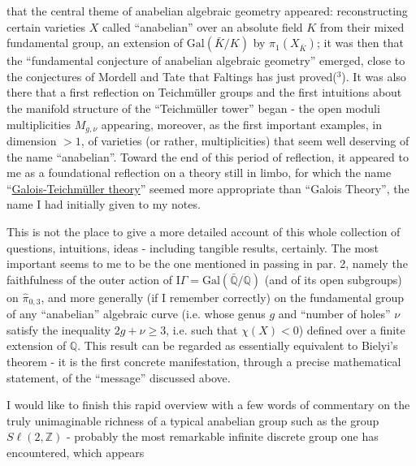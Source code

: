 
that the central theme of anabelian algebraic geometry appeared:
reconstructing certain varieties $X$ called ``anabelian''
over an absolute field $K$ from their mixed fundamental group,
an extension of $\mathrm{Gal}(\bar{K}/K)$ by $\pi_1(X_{\bar{K}})$; it was then that the
``fundamental conjecture of anabelian algebraic geometry'' emerged,
close to the conjectures of Mordell and Tate that Faltings
has just proved($^3$). It was also there that a first reflection on
Teichmüller groups and the first intuitions about the manifold
structure of the ``Teichmüller tower'' began - the open moduli
multiplicities $M_{g,\nu}$ appearing, moreover, as the first important
examples, in dimension $> 1$, of varieties (or rather,
multiplicities) that seem well deserving of the name ``anabelian''.
Toward the end of this period of reflection, it appeared to me
as a foundational reflection on a theory still in
limbo, for which the name ``\uline{Galois-Teichmüller theory}''
seemed more appropriate than ``Galois Theory'', the name I had initially
given to my notes.

This is not the place to give a more detailed account
of this whole collection of questions, intuitions, ideas - including
tangible results, certainly. The most important seems to me to be the one
mentioned in passing in par. 2, namely the faithfulness of the outer
action of $\mathrm{I}\!\Gamma = \mathrm{Gal}(\bar{\mathbb{Q}}/\mathbb{Q})$ (and of its open subgroups) on $\hat{\pi}_{0,3}$,
and more generally (if I remember correctly) on the fundamental
group of any ``anabelian'' algebraic curve (i.e. whose genus
$g$ and ``number of holes'' $\nu$ satisfy the inequality $2g + \nu \geq 3$,
i.e. such that $\chi(X) < 0$) defined over a finite extension of $\mathbb{Q}$. This
result can be regarded as essentially equivalent to
Bielyi's theorem - it is the first concrete manifestation, through
a precise mathematical statement, of the ``message'' discussed
above.

I would like to finish this rapid overview with a few words
of commentary on the truly unimaginable richness of a typical
anabelian group such as the group $S\ell(2,\mathbb{Z})$ - probably the most
remarkable infinite discrete group one has encountered, which appears


